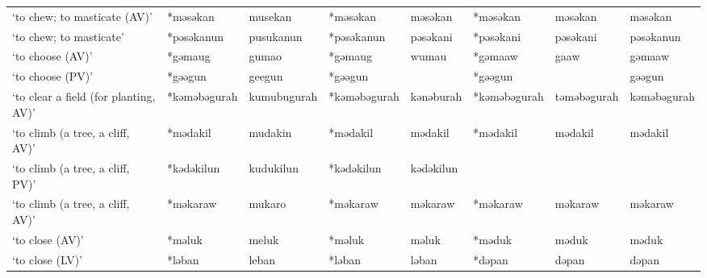 \begin{landscape}
\begin{longtable}[c]{@{}p{3cm}<{\raggedright}p{2.75cm}<{\raggedright}p{2.75cm}<{\raggedright}p{2.75cm}<{\raggedright}p{2.75cm}<{\raggedright}p{2.75cm}<{\raggedright}p{2.75cm}<{\raggedright}p{2.75cm}<{\raggedright}@{}}
`to chew; to masticate (AV)'                         & *məsəkan           & musekan                        & *məsəkan           & məsəkan                    & *məsəkan         & məsəkan                  & məsəkan                           \\
`to chew; to masticate'                              & *pəsəkanun         & pusukanun                      & *pəsəkanun         & pəsəkani                   & *pəsəkani        & pəsəkani                 & pəsəkanun                         \\
`to choose (AV)'                                     & *gəmaug            & gumao                          & *gəmaug            & wumau                      & *gəmaaw          & gaaw                     & gəmaaw                            \\
`to choose (PV)'                                     & *gəəgun            & geegun                         & *gəəgun            &                            & *gəəgun          &                          & gəəgun                            \\
`to clear a field (for planting, AV)'                & *kəməbəgurah       & kumubugurah                    & *kəməbəgurah       & kənəburah                  & *kəməbəgurah     & təməbəgurah              & kəməbəgurah                       \\
`to climb (a tree, a cliff, AV)'                     & *mədakil           & mudakin                        & *mədakil           & mədakil                    & *mədakil         & mədakil                  & mədakil                           \\
`to climb (a tree, a cliff, PV)'                     & *kədəkilun         & kudukilun                      & *kədəkilun         & kədəkilun                  &                  &                          &                                   \\
`to climb (a tree, a cliff, AV)'                     & *məkaraw           & mukaro                         & *məkaraw           & məkaraw                    & *məkaraw         & məkaraw                  & məkaraw                           \\
`to close (AV)'                                      & *məluk             & meluk                          & *məluk             & məluk                      & *məduk           & məduk                    & məduk                             \\
`to close (LV)'                                      & *ləban             & leban                          & *ləban             & ləban                      & *dəpan           & dəpan                    & dəpan                             \\

\end{longtable}
\end{landscape}
